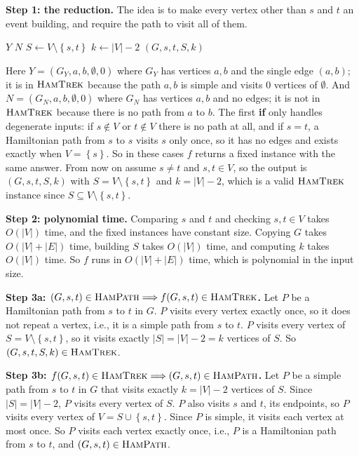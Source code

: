 \documentclass[11pt]{article}
\newcommand{\set}[1]{\left\{#1\right\}}
\newcommand{\abs}[1]{\left|#1\right|}
\newcommand{\cproblem}[1]{\textsc{#1}}
\newcommand{\HP}{\cproblem{HamPath}}
\newcommand{\HT}{\cproblem{HamTrek}}
\begin{document}
\textbf{Step 1: the reduction.}
The idea is to make every vertex other than $s$ and $t$ an event building, and require the path to visit all of them.

\begin{algorithmic}[1]
  \Ensure{An instance of $\HT$}
      \If{$s = t$ and $V = \set{s}$} \Return $Y$ 
      \Else{} \Return $N$ 
      \EndIf
    \EndIf
    \State $S \gets V \setminus \set{s, t}$
    \State $k \gets \abs{V} - 2$
    \State \Return $(G, s, t, S, k)$
  \EndFunction
\end{algorithmic}

Here $Y = (G_Y, a, b, \emptyset, 0)$ where $G_Y$ has vertices $a, b$ and the single edge $(a, b)$; it is in $\HT$ because the path $a, b$ is simple and visits $0$ vertices of $\emptyset$.
And $N = (G_N, a, b, \emptyset, 0)$ where $G_N$ has vertices $a, b$ and no edges; it is not in $\HT$ because there is no path from $a$ to $b$.
The first \textbf{if} only handles degenerate inputs: if $s \notin V$ or $t \notin V$ there is no path at all, and if $s = t$, a Hamiltonian path from $s$ to $s$ visits $s$ only once, so it has no edges and exists exactly when $V = \set{s}$.
So in these cases $f$ returns a fixed instance with the same answer.
From now on assume $s \neq t$ and $s, t \in V$, so the output is $(G, s, t, S, k)$ with $S = V \setminus \set{s, t}$ and $k = \abs{V} - 2$, which is a valid $\HT$ instance since $S \subseteq V \setminus \set{s, t}$.

\textbf{Step 2: polynomial time.}
Comparing $s$ and $t$ and checking $s, t \in V$ takes $O(\abs{V})$ time, and the fixed instances have constant size.
Copying $G$ takes $O(\abs{V} + \abs{E})$ time, building $S$ takes $O(\abs{V})$ time, and computing $k$ takes $O(\abs{V})$ time.
So $f$ runs in $O(\abs{V} + \abs{E})$ time, which is polynomial in the input size.

\textbf{Step 3a: $(G, s, t) \in \HP \Longrightarrow f(G, s, t) \in \HT$.}
Let $P$ be a Hamiltonian path from $s$ to $t$ in $G$.
$P$ visits every vertex exactly once, so it does not repeat a vertex, i.e., it is a simple path from $s$ to $t$.
$P$ visits every vertex of $S = V \setminus \set{s, t}$, so it visits exactly $\abs{S} = \abs{V} - 2 = k$ vertices of $S$.
So $(G, s, t, S, k) \in \HT$.

\textbf{Step 3b: $f(G, s, t) \in \HT \Longrightarrow (G, s, t) \in \HP$.}
Let $P$ be a simple path from $s$ to $t$ in $G$ that visits exactly $k = \abs{V} - 2$ vertices of $S$.
Since $\abs{S} = \abs{V} - 2$, $P$ visits every vertex of $S$.
$P$ also visits $s$ and $t$, its endpoints, so $P$ visits every vertex of $V = S \cup \set{s, t}$.
Since $P$ is simple, it visits each vertex at most once.
So $P$ visits each vertex exactly once, i.e., $P$ is a Hamiltonian path from $s$ to $t$, and $(G, s, t) \in \HP$.
\end{document}
